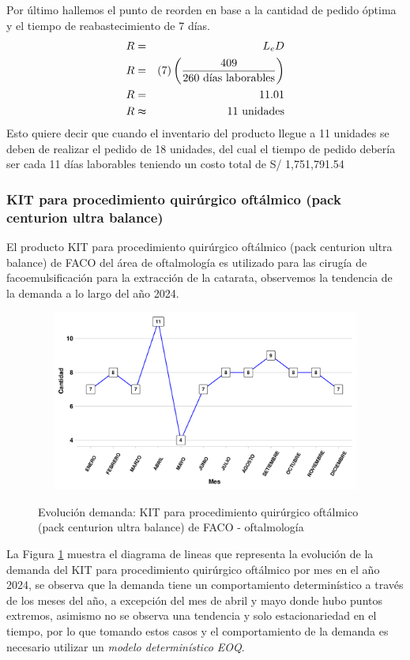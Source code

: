Por último hallemos el punto de reorden en base a la cantidad de pedido óptima y el tiempo de reabastecimiento de 7 días.
\begin{eqnarray}
    R &=& L_e D \nonumber \\
    R &=& (7) \left(\frac{409}{260 \text{ días laborables}} \right) \nonumber \\
    R &=& 11.01 \nonumber \\
    R &\thickapprox& 11 \text{ unidades} \nonumber
\end{eqnarray}
Esto quiere decir que cuando el inventario del producto llegue a 11 unidades se deben de realizar el pedido de 18 unidades, del cual el tiempo de pedido debería ser cada 11 días laborables teniendo un costo total de S/ 1,751,791.54
\subsubsection{KIT para procedimiento quirúrgico oftálmico (pack centurion ultra balance)}
El producto KIT para procedimiento quirúrgico oftálmico (pack centurion ultra balance) de FACO del área de oftalmología es utilizado para las cirugía de facoemulsificación para la extracción de la catarata, observemos la tendencia de la demanda a lo largo del año 2024.
\clearpage
\begin{figure}[H]
  \caption{Evolución demanda: KIT para procedimiento quirúrgico oftálmico (pack centurion ultra balance) de FACO - oftalmología}
  {\includegraphics[width=15cm, height=5.95cm]{images/PROD002_demanda.pdf}}
  \label{fig:PROD002_demanda}
\end{figure}
La Figura \ref{fig:PROD002_demanda} muestra el diagrama de lineas que representa la evolución de la demanda del KIT para procedimiento quirúrgico oftálmico por mes en el año 2024, se observa que la demanda tiene un comportamiento determinístico a través de los meses del año, a excepción del mes de abril y mayo donde hubo puntos extremos, asimismo no se observa una tendencia y solo estacionariedad en el tiempo, por lo que tomando estos casos y el comportamiento de la demanda es necesario utilizar un \textsl{modelo determinístico EOQ}.

